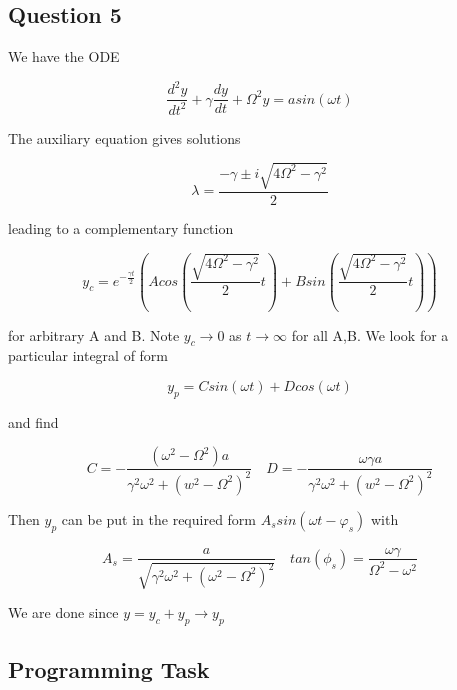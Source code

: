 \documentclass[10pt,a4paper]{report}
\begin{document}
\newpage

\subsection*{Question 5}

We have the ODE

\begin{equation*}
\frac{d^2y}{dt^2} + \gamma\frac{dy}{dt}+\Omega^2y=asin(\omega t)
\end{equation*}

The auxiliary equation gives solutions 

\begin{equation*}
\lambda = \frac{- \gamma \pm i \sqrt{4 \Omega ^2 - \gamma ^2}}{2}
\end{equation*}

leading to a complementary function 

\begin{equation*}
y_c=e^{-\frac{\gamma t}{2}}(Acos(\frac{\sqrt{4 \Omega ^2 - \gamma ^2}}{2}t)+Bsin(\frac{\sqrt{4 \Omega ^2 - \gamma ^2}}{2}t))
\end{equation*}

for arbitrary A and B. Note $y_c \rightarrow 0$ as $t\rightarrow\infty$ for all A,B. We look for a particular integral of form

\begin{equation*}
y_p=Csin(\omega t) + Dcos(\omega t)
\end{equation*}

and find

\begin{equation*}
C=-\frac{(\omega^2-\Omega^2)a}{\gamma^2\omega^2+(w^2-\Omega^2)^2}
\quad
D=-\frac{\omega\gamma a}{\gamma^2\omega^2+(w^2-\Omega^2)^2}
\end{equation*}

Then $y_p$ can be put in the required form $ A_s sin(\omega t - \varphi_s)$ with

\begin{equation*}
A_s = \frac{a}{\sqrt{\gamma^2\omega^2+(\omega^2-\Omega^2)^2}}
\quad
tan(\phi _s) = \frac{\omega\gamma}{\Omega^2-\omega^2}
\end{equation*}

We are done since $y=y_c+y_p\rightarrow y_p$

\subsection*{Programming Task}
\end{document}
